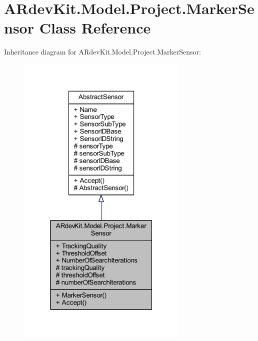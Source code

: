 \hypertarget{class_a_rdev_kit_1_1_model_1_1_project_1_1_marker_sensor}{\section{A\-Rdev\-Kit.\-Model.\-Project.\-Marker\-Sensor Class Reference}
\label{class_a_rdev_kit_1_1_model_1_1_project_1_1_marker_sensor}
}


Inheritance diagram for A\-Rdev\-Kit.\-Model.\-Project.\-Marker\-Sensor\-:
\nopagebreak
\begin{figure}[H]
\begin{center}
\leavevmode
\includegraphics[width=232pt]{class_a_rdev_kit_1_1_model_1_1_project_1_1_marker_sensor__inherit__graph}
\end{center}
\end{figure}


